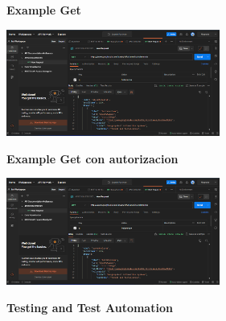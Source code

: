 \documentclass[twoside,twocolumn]{article}
\begin{document}
 \textbf{Example Get}
\begin{center}
	\includegraphics[width=7cm]{./Imagenes/postmanexample} 
\end{center}

\textbf{Example Get con autorizacion}
\begin{center}
	\includegraphics[width=7cm]{./Imagenes/postmanexample} 
\end{center}

 \textbf{Testing and Test Automation}
 
\end{document}
